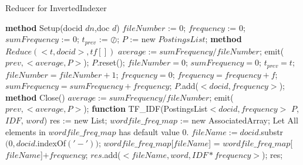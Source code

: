 \documentclass[a4paper,UTF8]{article}
\theoremstyle{definition}
\begin{document}
\begin{CJK}{UTF8}{gkai}
\newpage
\begin{algorithm}[htb]
\caption{Reducer for InvertedIndexer}
\label{alg:Framwork}
\begin{algorithmic}[1] %
	 \STATE \textbf{method} Setup(docid $dn$,doc $d$)
	 \STATE $fileNumber$ := $0$;
	 \STATE $frequency$ := $0$;
	 \STATE $sumFrequency$ := $0$;
	 \STATE $t_{prev}$ := $\oslash$;
	 \STATE $P$ := new $PostingsList$;
	 \STATE 
    \STATE \textbf{method} $Reduce(<t, docid>, tf[])$
		\STATE $average:=sumFrequency/fileNumber$;
	 	\STATE emit($prev, <average, P>$);
		\STATE $P$.reset();
		\STATE $fileNumber = 0$;
		\STATE $sumFrequency = 0$;
	 \ENDIF
	 \STATE $t_{prev} = t$;
	 \STATE $fileNumber = fileNumber + 1$;
	 \STATE $frequency = 0$;
	 	\STATE $frequency = frequency + f$;
	 \ENDFOR
	 \STATE $sumFrequency = sumFrequency + frequency$;
	 \STATE $P$.add($<docid, frequency>$);
	\STATE
    \STATE \textbf{method} Close()
		\STATE $average:=sumFrequency/fileNumber$;
	 	\STATE emit($prev, <average, P>$);
	 \STATE
    \STATE \textbf{function} TF\_IDF(PostingsList$<docid, frequency>$ $P$, $IDF$, $word$)
	 \STATE res := new List;
	 \STATE $wordfile\_freq\_map$ := new AssociatedArray;
	 \STATE Let All elements in $wordfile\_freq\_map$ has default value $0$.
		\STATE $fileName := docid$.substr$(0, docid.$indexOf$('-'))$;
		\STATE $wordfile\_freq\_map$[$fileName$] = $wordfile\_freq\_map$[$fileName$]$ + frequency$;
	 \ENDFOR
	 	\STATE $res$.add($<fileName, word, IDF*frequency>$);
	 \ENDFOR
	 \RETURN res;
\end{algorithmic}
\end{algorithm}
	
\begin{CJK*}{UTF8}{gbsn}

\end{CJK*}
\end{CJK}
\end{document}
